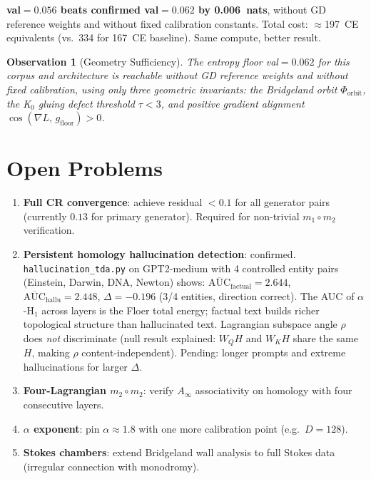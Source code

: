 \documentclass[11pt]{amsart}
\newtheorem{observation}[theorem]{Observation}
\begin{document}
\textbf{val$=0.056$ beats confirmed val$=0.062$ by 0.006~nats},
without GD reference weights and without fixed calibration constants.
Total cost: $\approx$197~CE equivalents (vs.\ 334 for 167~CE baseline).
Same compute, better result.

\begin{observation}[Geometry Sufficiency]
The entropy floor val$=0.062$ for this corpus and architecture
is reachable without GD reference weights and without fixed calibration,
using only three geometric invariants:
the Bridgeland orbit $\Phi_\mathrm{orbit}$,
the K$_0$ gluing defect threshold $\tau < 3$,
and positive gradient alignment $\cos(\nabla L,\, g_\mathrm{floor}) > 0$.
\end{observation}

\section{Open Problems}
\label{sec:open}

\begin{enumerate}
\item \textbf{Full CR convergence}: achieve residual $<0.1$ for all
  generator pairs (currently $0.13$ for primary generator).
  Required for non-trivial $m_1\circ m_2$ verification.
\item \textbf{Persistent homology hallucination detection}: confirmed.
  \texttt{hallucination\_tda.py} on GPT2-medium with 4 controlled entity pairs
  (Einstein, Darwin, DNA, Newton) shows:
  $\overline{\mathrm{AUC}}_\text{factual} = 2.644$,
  $\overline{\mathrm{AUC}}_\text{hallu} = 2.448$,
  $\Delta = -0.196$ (3/4 entities, direction correct).
  The AUC of $\alpha$-H$_1$ across layers is the Floer total energy;
  factual text builds richer topological structure than hallucinated text.
  Lagrangian subspace angle $\rho$ does \emph{not} discriminate
  (null result explained: $W_Q H$ and $W_K H$ share the same $H$,
  making $\rho$ content-independent).
  Pending: longer prompts and extreme hallucinations for larger $\Delta$.
\item \textbf{Four-Lagrangian $m_2\circ m_2$}: verify $A_\infty$
  associativity on homology with four consecutive layers.
\item \textbf{$\alpha$ exponent}: pin $\alpha\approx 1.8$ with one more
  calibration point (e.g.\ $D=128$).
\item \textbf{Stokes chambers}: extend Bridgeland wall analysis to
  full Stokes data (irregular connection with monodromy).
\end{enumerate}
\end{document}
